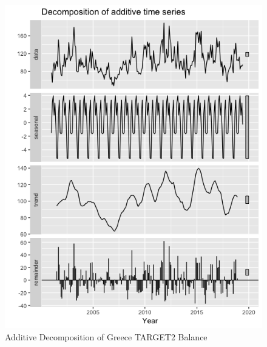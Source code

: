 \documentclass[12pt]{article}
\begin{document}
\begin{figure}[!tbp]
  \centering
  \begin{minipage}[b]{0.49\textwidth}
    \includegraphics[width=\textwidth]{Additive.png}
    \caption{Additive Decomposition of Greece TARGET2 Balance}
  \end{minipage}
  \hfill
  \begin{minipage}[b]{0.49\textwidth}

\end{minipage}
\end{figure}
\end{document}
